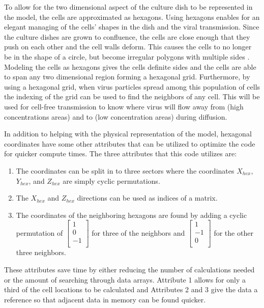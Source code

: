 To allow for the two dimensional aspect of the culture dish to be represented in the model, the cells are approximated as hexagons. Using hexagons enables for an elegant managing of the cells' shapes in the dish and the viral transmission. Since the culture dishes are grown to confluence, the cells are close enough that they push on each other and the cell walls deform. This causes the cells to no longer be in the shape of a circle, but become irregular polygons with multiple sides \cite{bruckner_importance_2018}. Modeling the cells as hexagons gives the cells definite sides and the cells are able to span any two dimensional region forming a hexagonal grid. Furthermore, by using a hexagonal grid, when virus particles spread among this population of cells the indexing of the grid can be used to find the neighbors of any cell. This will be used for cell-free transmission to know where virus will flow away from (high concentrations areas) and to (low concentration areas) during diffusion. 

In addition to helping with the physical representation of the model, hexagonal coordinates have some other attributes that can be utilized to optimize the code for quicker compute times. The three attributes that this code utilizes are:
\begin{enumerate} 
    \item The coordinates can be split in to three sectors where the coordinates $X_{hex}$, $Y_{hex}$, and $Z_{hex}$ are simply cyclic permutations.
    \item The $X_{hex}$ and $Z_{hex}$ directions can be used as indices of a matrix.
    \item The coordinates of the neighboring hexagons are found by adding a cyclic permutation of 
        $\left [
            \begin{array}{c}
                1 \\
                0 \\
                -1\\
            \end{array}
        \right ]$
        for three of the neighbors and
        $\left [ 
            \begin{array}{c}
                1 \\
                -1 \\
                0\\
            \end{array}
        \right ]$
        for the other three neighbors.
\end{enumerate}
These attributes save time by either reducing the number of calculations needed or the amount of searching through data arrays. Attribute 1 allows for only a third of the cell locations to be calculated and Attributes 2 and 3 give the data a reference so that adjacent data in memory can be found quicker.

